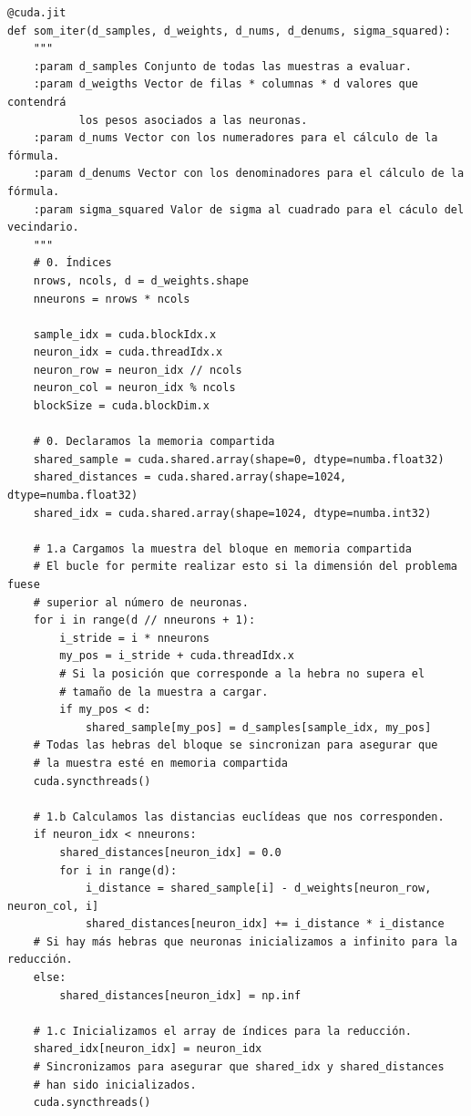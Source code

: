 \begin{code}
\begin{verbatim}
@cuda.jit
def som_iter(d_samples, d_weights, d_nums, d_denums, sigma_squared):
    """
    :param d_samples Conjunto de todas las muestras a evaluar.
    :param d_weigths Vector de filas * columnas * d valores que contendrá 
           los pesos asociados a las neuronas.
    :param d_nums Vector con los numeradores para el cálculo de la fórmula.
    :param d_denums Vector con los denominadores para el cálculo de la fórmula.
    :param sigma_squared Valor de sigma al cuadrado para el cáculo del vecindario.
    """
    # 0. Índices
    nrows, ncols, d = d_weights.shape
    nneurons = nrows * ncols
    
    sample_idx = cuda.blockIdx.x
    neuron_idx = cuda.threadIdx.x
    neuron_row = neuron_idx // ncols
    neuron_col = neuron_idx % ncols
    blockSize = cuda.blockDim.x
       
    # 0. Declaramos la memoria compartida
    shared_sample = cuda.shared.array(shape=0, dtype=numba.float32)
    shared_distances = cuda.shared.array(shape=1024, dtype=numba.float32)
    shared_idx = cuda.shared.array(shape=1024, dtype=numba.int32)
    
    # 1.a Cargamos la muestra del bloque en memoria compartida 
    # El bucle for permite realizar esto si la dimensión del problema fuese
    # superior al número de neuronas.
    for i in range(d // nneurons + 1):
        i_stride = i * nneurons
        my_pos = i_stride + cuda.threadIdx.x
        # Si la posición que corresponde a la hebra no supera el
        # tamaño de la muestra a cargar.
        if my_pos < d: 
            shared_sample[my_pos] = d_samples[sample_idx, my_pos]
    # Todas las hebras del bloque se sincronizan para asegurar que
    # la muestra esté en memoria compartida
    cuda.syncthreads()
    
    # 1.b Calculamos las distancias euclídeas que nos corresponden.
    if neuron_idx < nneurons:
        shared_distances[neuron_idx] = 0.0
        for i in range(d):
            i_distance = shared_sample[i] - d_weights[neuron_row, neuron_col, i]
            shared_distances[neuron_idx] += i_distance * i_distance
    # Si hay más hebras que neuronas inicializamos a infinito para la reducción.
    else: 
        shared_distances[neuron_idx] = np.inf
    
    # 1.c Inicializamos el array de índices para la reducción.
    shared_idx[neuron_idx] = neuron_idx
    # Sincronizamos para asegurar que shared_idx y shared_distances 
    # han sido inicializados.
    cuda.syncthreads()    
\end{verbatim}
\label{code:somiter1}
\end{code}

